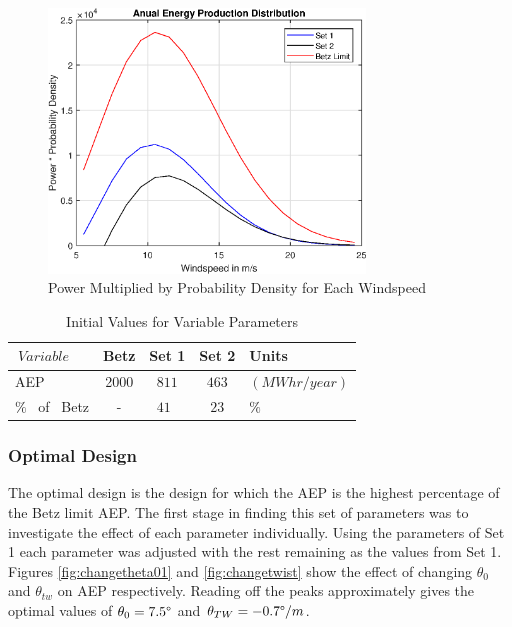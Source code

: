 \documentclass[11pt]{article}
\newcommand{\ra}[1]{\renewcommand{\arraystretch}{#1}}
\begin{document}
\begin{figure}[h!]
\centering
	\includegraphics[width=0.75\textwidth]{AEP1}
	\caption{Power Multiplied by Probability Density for Each Windspeed}\label{fig:aep1}
\end{figure}


\begin{table}[!h]
\centering %
\ra{1.3}
\begin{tabular}{@{}lcccl@{}}\toprule
 $\ Variable \ $ & Betz & Set 1 &  Set 2 & Units \\
\midrule
AEP \   & 2000 &$ 811 $ & $ 463 $ & $(MWhr/year)$ \\
$\%$ \ of  \ Betz & - &$ 41 $\ & $ 23$  & $ \%$\ \\
\bottomrule
\end{tabular}
\caption{Initial Values for Variable Parameters}
\label{table:setcomp}
\end{table}


\subsubsection{Optimal Design}

The optimal design is the design for which the AEP is the highest percentage of the Betz limit AEP. The first stage in finding this set of parameters was to investigate the effect of each parameter individually. Using the parameters of Set 1 each parameter was adjusted with the rest remaining as the values from Set 1. Figures \ref{fig:changetheta01} and \ref{fig:changetwist} show the effect of changing $\theta_0$ and $\theta_{tw}$ on AEP respectively. Reading off the peaks approximately gives the optimal values of $ \theta_0 = 7.5 \degree$ and $\theta_{TW} = -0.7 \degree/m$. 
\end{document}
